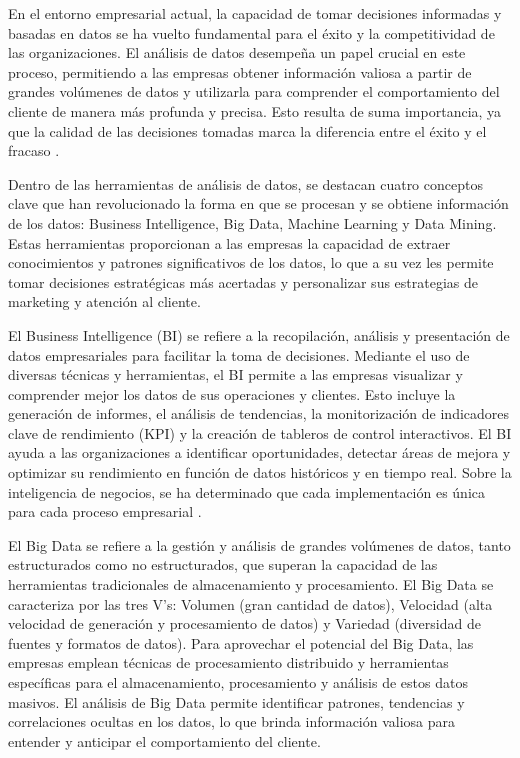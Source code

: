 En el entorno empresarial actual, la capacidad de tomar decisiones informadas y basadas en datos se ha vuelto fundamental para el éxito y la competitividad de las organizaciones. El análisis de datos desempeña un papel crucial en este proceso, permitiendo a las empresas obtener información valiosa a partir de grandes volúmenes de datos y utilizarla para comprender el comportamiento del cliente de manera más profunda y precisa. Esto resulta de suma importancia, ya que la calidad de las decisiones tomadas marca la diferencia entre el éxito y el fracaso \cite{analitica-predictiva}.

Dentro de las herramientas de análisis de datos, se destacan cuatro conceptos clave que han revolucionado la forma en que se procesan y se obtiene información de los datos: Business Intelligence, Big Data, Machine Learning y Data Mining. Estas herramientas proporcionan a las empresas la capacidad de extraer conocimientos y patrones significativos de los datos, lo que a su vez les permite tomar decisiones estratégicas más acertadas y personalizar sus estrategias de marketing y atención al cliente.

El Business Intelligence (BI) se refiere a la recopilación, análisis y presentación de datos empresariales para facilitar la toma de decisiones. Mediante el uso de diversas técnicas y herramientas, el BI permite a las empresas visualizar y comprender mejor los datos de sus operaciones y clientes. Esto incluye la generación de informes, el análisis de tendencias, la monitorización de indicadores clave de rendimiento (KPI) y la creación de tableros de control interactivos. El BI ayuda a las organizaciones a identificar oportunidades, detectar áreas de mejora y optimizar su rendimiento en función de datos históricos y en tiempo real. Sobre la inteligencia de negocios, se ha determinado que cada implementación es única para cada proceso empresarial \cite{analitica-empresarial}.

El Big Data se refiere a la gestión y análisis de grandes volúmenes de datos, tanto estructurados como no estructurados, que superan la capacidad de las herramientas tradicionales de almacenamiento y procesamiento. El Big Data se caracteriza por las tres V's: Volumen (gran cantidad de datos), Velocidad (alta velocidad de generación y procesamiento de datos) y Variedad (diversidad de fuentes y formatos de datos). Para aprovechar el potencial del Big Data, las empresas emplean técnicas de procesamiento distribuido y herramientas específicas para el almacenamiento, procesamiento y análisis de estos datos masivos. El análisis de Big Data permite identificar patrones, tendencias y correlaciones ocultas en los datos, lo que brinda información valiosa para entender y anticipar el comportamiento del cliente.

